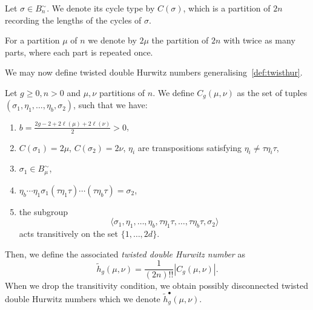 \begin{defi}
Let $\sigma\in B^{\sim}_n$. We denote its cycle type by $C(\sigma)$, which is a partition of $2n$ recording the lengths of the cycles of $\sigma$.
\end{defi}

For a partition $\mu$ of $n$ we denote by $2\mu$ the partition of $2n$ with twice as many parts, where each part is repeated once.

We may now define twisted double Hurwitz numbers generalising~\cref{def:twisthur}.

\begin{defi}
\label{def:twisthurdou}
Let $g\ge0,n>0$ and $\mu,\nu$ partitions of $n$. We define $C_g(\mu,\nu)$ as the set of tuples $(\sigma_1,\eta_1,\dots,\eta_b,\sigma_2)$,
such that we have:
\begin{enumerate}
    \item $b=\frac{2g-2+2\ell(\mu)+2\ell(\nu)}{2}>0$,
    \item $C(\sigma_1)=2\mu$, $C(\sigma_2)=2\nu$, $\eta_i$ are transpositions satisfying $\eta_i\neq \tau \eta_i \tau$,
    \item $\sigma_1\in B^\sim_\mu$,
    \item $\eta_b\cdots\eta_1\sigma_1(\tau\eta_1\tau)\cdots(\tau\eta_b\tau)=\sigma_2$,
    \item the subgroup 
    $$\langle \sigma_1,\eta_1,\ldots,\eta_{b},\tau \eta_1\tau, \ldots,\tau\eta_b\tau,\sigma_2\rangle$$ acts transitively on the set $\{1,\ldots,2d\}$.
\end{enumerate}
Then, we define the associated \textit{twisted double Hurwitz number} as
\begin{equation*}
    \tilde{h}_{g}(\mu,\nu)=\frac{1}{(2n)!!}|C_g(\mu,\nu)|.
\end{equation*}
When we drop the transitivity condition, we obtain possibly disconnected twisted double Hurwitz numbers which we denote $\tilde{h}_{g}^\bullet(\mu,\nu)$.
\end{defi}

